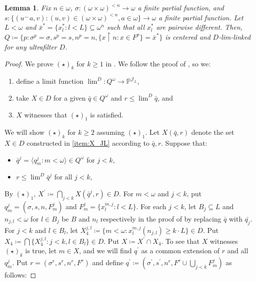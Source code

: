 \documentclass[a4paper,12pt]{amsart}
\newtheorem{lem}[thm]{Lemma}
\theoremstyle{definition}
\numberwithin{thm}{section}
\numberwithin{equation}{section}
\newcommand{\on}{\mathpunct{\upharpoonright}}
\newcommand{\J}{\mathscr{J}}
\newcommand{\posetJL}{\mathbb{P}^{\J_L}}
\begin{document}
    \begin{lem}\label{lem:posetfin_centered_Frlinked}
    	Fix $n\in\omega$, $\sigma\colon(\omega\times\omega)^{<n}\to\omega$ a finite partial function, and $s\colon\{(u^\frown a,v):(u,v)\in(\omega\times\omega)^{<n},a\in\omega\}\to\omega$ a finite partial function. Let $L<\omega$ and $\bar{x}^*=\{x^*_l:l<L\}\subseteq\omega^n$ such that all $x^*_l$ are pairwise different. 
    	Then, $Q\coloneqq\{p:\sigma^p=\sigma, s^p=s,n^p=n, \{x\on n:x\in F^p\}=\bar{x}^*\}$
    	is centered and $D$-lim-linked for any ultrafilter $D$. 
    \end{lem}
    \begin{proof}
        We prove $(\star)_k$ for $k\geq1$ in .
        We follow the proof of , so we:
        \begin{enumerate}
            \item define a limit function $\lim^D\colon Q^\omega\to\posetJL$, 
            \item\label{item:X_JL} take $X\in D$ for a given $\bar{q}\in Q^\omega$ and $r\leq \lim^D \bar{q}$, and 
            \item $X$ witnesses that $(\star)_1$ is satisfied.
        \end{enumerate}
    	We will show $(\star)_k$ for $k\geq2$ assuming $(\star)_1$.
        Let $X(\bar{q},r)$ denote the set $X\in D$ constructed in \eqref{item:X_JL} according to $\bar{q},r$.
    	Suppose that:
    	\begin{itemize}
    		\item $\bar{q}^j=\langle q_m^j:m<\omega\rangle\in Q^\omega$ for $j<k$,
    		\item $r\leq\lim^D\bar{q}^j$ for all $j<k$,
    	\end{itemize}
    	By $(\star)_1$, $X^\prime\coloneqq \bigcap_{j<k}X(\bar{q}^j, r)\in D$.
        For $m<\omega$ and $j<k$, put $q^j_m=(\sigma,s,n,F^j_m)$ and $F^j_m=\{x^{m,j}_l:l<L\}$. For each $j<k$, let $B_j\subseteq L$ and $n_{j,l}<\omega$ for $l\in B_j$ be $B$ and $n_l$ respectively in the proof of  by replacing $\bar{q}$ with $\bar{q_j}$. For $j<k$ and $l\in B_l$, let $X^{j,l}_4\coloneqq\{m<\omega:x^{m,j}_l(n_{j,l})\geq k\cdot L\}\in D$. Put $X_4\coloneqq\bigcap\{X^{j,l}_4:j<k,l\in B_l\}\in D$.
        Put $X\coloneqq X^\prime\cap X_4$.
        To see that $X$ witnesses $(\star)_k$ is true,
    	let $m\in X$, and we will find $q^\prime$ as a common extension of $r$ and all $q_m^j$. Put $r=(\sigma^r,s^r,n^r,F^r)$ and define $q^\prime\coloneqq (\sigma^\prime,s^\prime,n^r,F^r\cup \bigcup_{j<k}F^j_m)$ as follows:
        

\end{proof}
\end{document}
